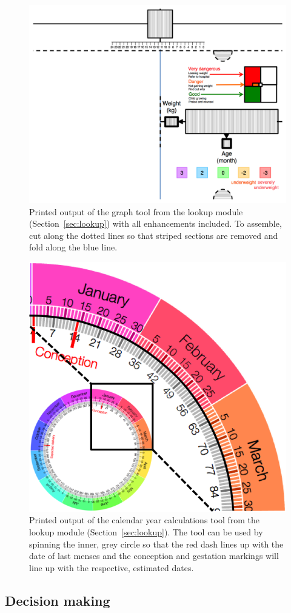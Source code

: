 \documentclass{sig-alternate}
\begin{document}
\begin{figure}
\centering
\includegraphics[width=.9\linewidth]{img/graph-print.png}
\caption{Printed output of the graph tool from the lookup module (Section~\ref{sec:lookup}) with all enhancements included. To assemble, cut along the dotted lines so that striped sections are removed and fold along the blue line.}
\label{fig:graph-print}
\end{figure}

\begin{figure}
\centering
\includegraphics[width=.5\linewidth]{img/circletool.png}
\caption{Printed output of the calendar year calculations tool from the lookup module (Section~\ref{sec:lookup}). The tool can be used by spinning the inner, grey circle so that the red dash lines up with the date of last menses and the conception and gestation markings will line up with the respective, estimated dates.}
\label{fig:circletool}
\end{figure}

\subsection{Decision making}
\label{sec:decision}
\end{document}
